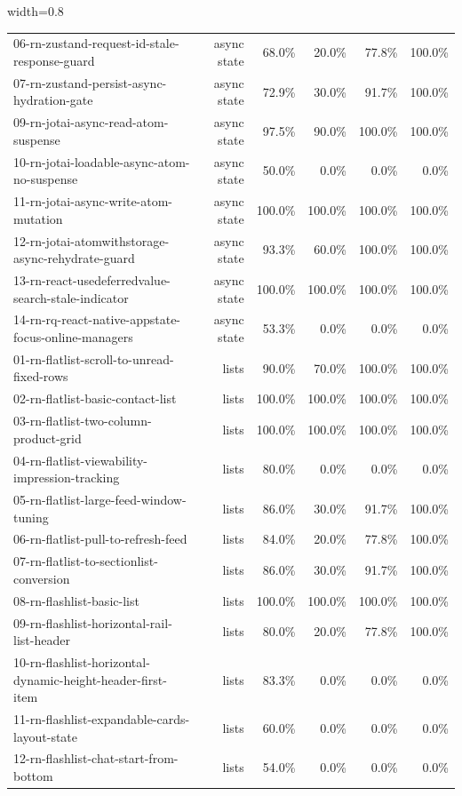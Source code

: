 \begin{table}[htbp]
\begin{adjustbox}{width=0.8\textwidth}
\begin{tabular}{lrrrrr}
06-rn-zustand-request-id-stale-response-guard & async state & 68.0\% & 20.0\% & 77.8\% & 100.0\% \\
07-rn-zustand-persist-async-hydration-gate & async state & 72.9\% & 30.0\% & 91.7\% & 100.0\% \\
09-rn-jotai-async-read-atom-suspense & async state & 97.5\% & 90.0\% & 100.0\% & 100.0\% \\
10-rn-jotai-loadable-async-atom-no-suspense & async state & 50.0\% & 0.0\% & 0.0\% & 0.0\% \\
11-rn-jotai-async-write-atom-mutation & async state & 100.0\% & 100.0\% & 100.0\% & 100.0\% \\
12-rn-jotai-atomwithstorage-async-rehydrate-guard & async state & 93.3\% & 60.0\% & 100.0\% & 100.0\% \\
13-rn-react-usedeferredvalue-search-stale-indicator & async state & 100.0\% & 100.0\% & 100.0\% & 100.0\% \\
14-rn-rq-react-native-appstate-focus-online-managers & async state & 53.3\% & 0.0\% & 0.0\% & 0.0\% \\
01-rn-flatlist-scroll-to-unread-fixed-rows & lists & 90.0\% & 70.0\% & 100.0\% & 100.0\% \\
02-rn-flatlist-basic-contact-list & lists & 100.0\% & 100.0\% & 100.0\% & 100.0\% \\
03-rn-flatlist-two-column-product-grid & lists & 100.0\% & 100.0\% & 100.0\% & 100.0\% \\
04-rn-flatlist-viewability-impression-tracking & lists & 80.0\% & 0.0\% & 0.0\% & 0.0\% \\
05-rn-flatlist-large-feed-window-tuning & lists & 86.0\% & 30.0\% & 91.7\% & 100.0\% \\
06-rn-flatlist-pull-to-refresh-feed & lists & 84.0\% & 20.0\% & 77.8\% & 100.0\% \\
07-rn-flatlist-to-sectionlist-conversion & lists & 86.0\% & 30.0\% & 91.7\% & 100.0\% \\
08-rn-flashlist-basic-list & lists & 100.0\% & 100.0\% & 100.0\% & 100.0\% \\
09-rn-flashlist-horizontal-rail-list-header & lists & 80.0\% & 20.0\% & 77.8\% & 100.0\% \\
10-rn-flashlist-horizontal-dynamic-height-header-first-item & lists & 83.3\% & 0.0\% & 0.0\% & 0.0\% \\
11-rn-flashlist-expandable-cards-layout-state & lists & 60.0\% & 0.0\% & 0.0\% & 0.0\% \\
12-rn-flashlist-chat-start-from-bottom & lists & 54.0\% & 0.0\% & 0.0\% & 0.0\% \\

\end{tabular}
\end{adjustbox}
\end{table}
